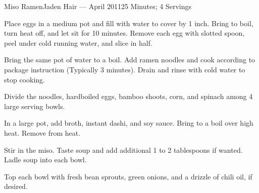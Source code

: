 \documentclass{article}
\begin{document}
\begin{recipe}{Miso Ramen}{Jaden Hair --- April 2011}{25 Minutes; 4 Servings}

    Place eggs in a medium pot and fill with water to cover by 1 inch. Bring to
    boil, turn heat off, and let sit for 10 minutes. Remove each egg with
    slotted spoon, peel under cold running water, and slice in half. 

    Bring the same pot of water to a boil. Add ramen noodles and cook according
    to package instruction (Typically 3 minutes). Drain and rinse with cold
    water to stop cooking.

    Divide the noodles, hardboiled eggs, bamboo shoots, corn, and spinach among
    4 large serving bowls.

    In a large pot, add broth, instant dashi, and soy sauce. Bring to a boil
    over high heat. Remove from heat.

    Stir in the miso. Taste soup and add additional 1 to 2 tablespoons if
    wanted. Ladle soup into each bowl.

    Top each bowl with fresh bean sprouts, green onions, and a drizzle of chili
    oil, if desired.

\end{recipe}
\end{document}
